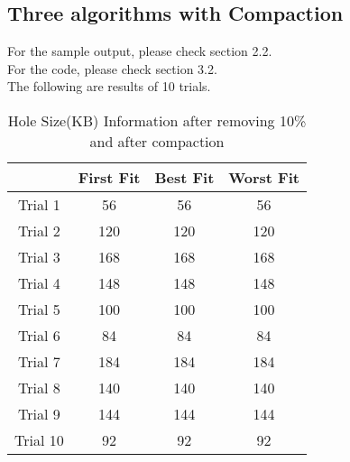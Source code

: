 \documentclass[12pt]{article}
\begin{document}
\subsection{Three algorithms with Compaction}
For the sample output, please check section 2.2.\\
For the code, please check section 3.2.\\
The following are results of 10 trials.
\begin{table}[h!]
\centering
\begin{tabular}{|c|c|c|c|}
\hline
         & First Fit & Best Fit & Worst Fit \\ \hline
Trial 1  & 56        & 56       & 56        \\ \hline
Trial 2  & 120       & 120      & 120       \\ \hline
Trial 3  & 168       & 168      & 168       \\ \hline
Trial 4  & 148       & 148      & 148       \\ \hline
Trial 5  & 100       & 100      & 100       \\ \hline
Trial 6  & 84        & 84       & 84        \\ \hline
Trial 7  & 184       & 184      & 184       \\ \hline
Trial 8  & 140       & 140      & 140       \\ \hline
Trial 9  & 144       & 144      & 144       \\ \hline
Trial 10 & 92        & 92       & 92        \\ \hline
\end{tabular}
\caption{Hole Size(KB) Information after removing 10\% and after compaction}
\end{table}
\end{document}
